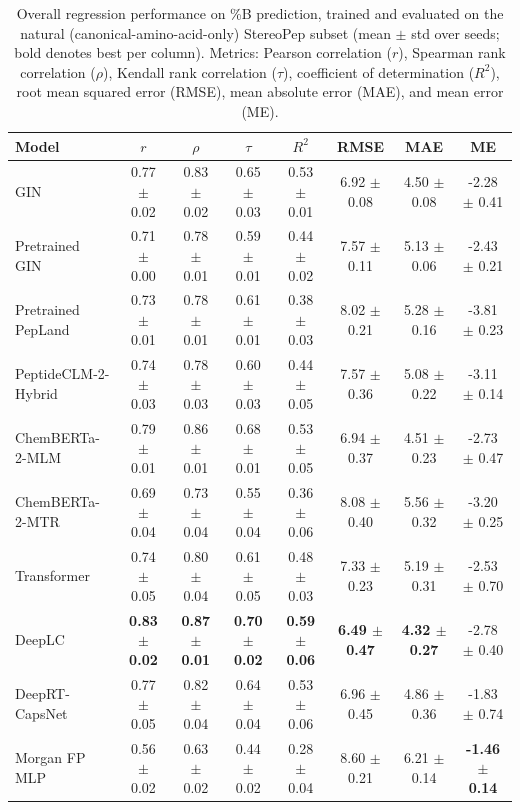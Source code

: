 \begin{table}[htbp]
  \caption{Overall regression performance on \%B prediction, trained and evaluated on the natural (canonical-amino-acid-only) StereoPep subset (mean $\pm$ std over seeds; bold denotes best per column). Metrics: Pearson correlation ($r$), Spearman rank correlation ($\rho$), Kendall rank correlation ($\tau$), coefficient of determination ($R^2$), root mean squared error (RMSE), mean absolute error (MAE), and mean error (ME).}
  \label{tab:overall_performance_natural}
  \centering
  \scriptsize
  \setlength{\tabcolsep}{6pt}
  \begin{tabular}{lccccccc}
    \toprule
    \textbf{Model} & \textbf{$r$} & \textbf{$\rho$} & \textbf{$\tau$} & \textbf{$R^2$} & \textbf{RMSE} & \textbf{MAE} & \textbf{ME} \\
    \midrule
    GIN & 0.77 $\pm$ 0.02 & 0.83 $\pm$ 0.02 & 0.65 $\pm$ 0.03 & 0.53 $\pm$ 0.01 & 6.92 $\pm$ 0.08 & 4.50 $\pm$ 0.08 & -2.28 $\pm$ 0.41 \\
    Pretrained GIN & 0.71 $\pm$ 0.00 & 0.78 $\pm$ 0.01 & 0.59 $\pm$ 0.01 & 0.44 $\pm$ 0.02 & 7.57 $\pm$ 0.11 & 5.13 $\pm$ 0.06 & -2.43 $\pm$ 0.21 \\
    Pretrained PepLand & 0.73 $\pm$ 0.01 & 0.78 $\pm$ 0.01 & 0.61 $\pm$ 0.01 & 0.38 $\pm$ 0.03 & 8.02 $\pm$ 0.21 & 5.28 $\pm$ 0.16 & -3.81 $\pm$ 0.23 \\
    PeptideCLM-2-Hybrid & 0.74 $\pm$ 0.03 & 0.78 $\pm$ 0.03 & 0.60 $\pm$ 0.03 & 0.44 $\pm$ 0.05 & 7.57 $\pm$ 0.36 & 5.08 $\pm$ 0.22 & -3.11 $\pm$ 0.14 \\
    ChemBERTa-2-MLM & 0.79 $\pm$ 0.01 & 0.86 $\pm$ 0.01 & 0.68 $\pm$ 0.01 & 0.53 $\pm$ 0.05 & 6.94 $\pm$ 0.37 & 4.51 $\pm$ 0.23 & -2.73 $\pm$ 0.47 \\
    ChemBERTa-2-MTR & 0.69 $\pm$ 0.04 & 0.73 $\pm$ 0.04 & 0.55 $\pm$ 0.04 & 0.36 $\pm$ 0.06 & 8.08 $\pm$ 0.40 & 5.56 $\pm$ 0.32 & -3.20 $\pm$ 0.25 \\
    Transformer & 0.74 $\pm$ 0.05 & 0.80 $\pm$ 0.04 & 0.61 $\pm$ 0.05 & 0.48 $\pm$ 0.03 & 7.33 $\pm$ 0.23 & 5.19 $\pm$ 0.31 & -2.53 $\pm$ 0.70 \\
    DeepLC & \textbf{0.83 $\pm$ 0.02} & \textbf{0.87 $\pm$ 0.01} & \textbf{0.70 $\pm$ 0.02} & \textbf{0.59 $\pm$ 0.06} & \textbf{6.49 $\pm$ 0.47} & \textbf{4.32 $\pm$ 0.27} & -2.78 $\pm$ 0.40 \\
    DeepRT-CapsNet & 0.77 $\pm$ 0.05 & 0.82 $\pm$ 0.04 & 0.64 $\pm$ 0.04 & 0.53 $\pm$ 0.06 & 6.96 $\pm$ 0.45 & 4.86 $\pm$ 0.36 & -1.83 $\pm$ 0.74 \\
    Morgan FP MLP & 0.56 $\pm$ 0.02 & 0.63 $\pm$ 0.02 & 0.44 $\pm$ 0.02 & 0.28 $\pm$ 0.04 & 8.60 $\pm$ 0.21 & 6.21 $\pm$ 0.14 & \textbf{-1.46 $\pm$ 0.14} \\
    \bottomrule
  \end{tabular}
\end{table}
